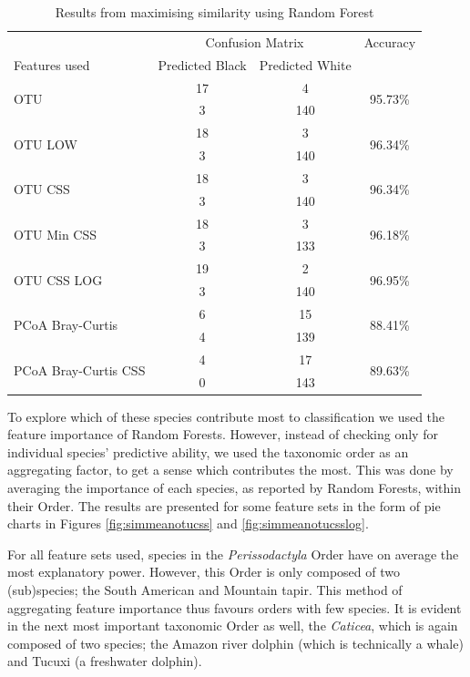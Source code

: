 \begin{table}[h]
	\centering
\begin{tabular}{l c  c c}
	\toprule
	&\multicolumn{2}{c}{Confusion Matrix} & Accuracy\\
	Features used & Predicted Black&Predicted White&\\
	
	\midrule
	\multirow{2}{*}{OTU} &17 &4&\multirow{2}{*}{95.73\%}\\
	&	 3&140&\\
	\cmidrule{2-3}
	\multirow{2}{*}{OTU LOW} &18 &3&\multirow{2}{*}{96.34\%}\\
	&	 3&140&\\
	\cmidrule{2-3}
	\multirow{2}{*}{OTU CSS} &18 &3&\multirow{2}{*}{96.34\%}\\
	&	 3&140&\\
	\cmidrule{2-3}
	\multirow{2}{*}{OTU Min CSS}&18 &3&\multirow{2}{*}{96.18\%}\\
	&	 3&133&\\
	\cmidrule{2-3}
	\multirow{2}{*}{OTU CSS LOG} &19 &2&\multirow{2}{*}{96.95\%}\\
	&	 3&140&\\
	\cmidrule{2-3}
	\multirow{2}{*}{PCoA Bray-Curtis} &6 &15&\multirow{2}{*}{88.41\%}\\
	&	 4&139&\\
	\cmidrule{2-3}
	\multirow{2}{*}{PCoA Bray-Curtis CSS} &4 &17&\multirow{2}{*}{89.63\%}\\
	&	 0&143&\\
	\bottomrule
\end{tabular}
\caption{Results from maximising similarity using Random Forest}
\label{table:rfrsimilarity}
\end{table}

To explore which of these species contribute most to classification we used the feature importance of Random Forests. However, instead of checking only for individual species' predictive ability, we used the taxonomic order as an aggregating factor, to get a sense which contributes the most. This was done by averaging the importance of each species, as reported by Random Forests, within their Order. The results are presented for some feature sets in the form of pie charts in Figures \ref{fig:simmeanotucss} and \ref{fig:simmeanotucsslog}. 

For all feature sets used, species in the \textit{Perissodactyla} Order have on average the most explanatory power. However, this Order is only composed of two (sub)species; the South American and Mountain tapir. This method of aggregating feature importance thus favours orders with few species. It is evident in the next most important taxonomic Order as well, the \textit{Caticea}, which is again composed of two species; the Amazon river dolphin (which is technically a whale) and Tucuxi (a freshwater dolphin). 

